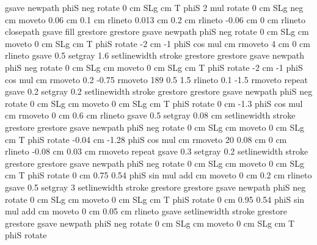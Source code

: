 {{gsave
     newpath
     phiS neg rotate
       0 cm SLg cm T
        phiS 2 mul rotate
         0 cm SLg  neg cm moveto
         0.06 cm 0.1 cm rlineto
         0.013 cm 0.2 cm rlineto
        -0.06 cm 0 cm rlineto
       closepath
     gsave
       \pst@usecolor\PoCMineCol fill
    grestore
grestore
gsave
     newpath
        phiS neg rotate
        0 cm SLg cm moveto
        0 cm SLg cm T
        phiS rotate
        -2 cm -1 phiS cos mul cm rmoveto
        4 cm 0 cm rlineto
    gsave
         0.5 setgray
                1.6 setlinewidth
         stroke
    grestore
grestore
gsave
     newpath
        phiS neg rotate
        0 cm SLg cm moveto
        0 cm SLg cm T
        phiS rotate
        -2 cm -1 phiS cos mul cm rmoveto
        0.2 -0.75 rmoveto
       189 { 0.5 1.5 rlineto
        0.1 -1.5 rmoveto } repeat
    gsave
         0.2 setgray
                0.2 setlinewidth
         stroke
    grestore
grestore
gsave
     newpath
        phiS neg rotate
        0 cm SLg cm moveto
        0 cm SLg cm T
        phiS rotate
        0 cm -1.3 phiS cos mul cm rmoveto
        0 cm 0.6 cm rlineto
    gsave
         0.5 setgray
                0.08 cm setlinewidth
         stroke
    grestore
grestore
gsave
     newpath
        phiS neg rotate
        0 cm SLg cm moveto
        0 cm SLg cm T
        phiS rotate
        -0.04 cm -1.28 phiS cos mul cm rmoveto
        20 { 0.08 cm 0 cm rlineto
        -0.08 cm 0.03 cm rmoveto } repeat
    gsave
         0.3 setgray
                0.2 setlinewidth
         stroke
    grestore
grestore
gsave
     newpath
        phiS neg rotate
        0 cm SLg cm moveto
        0 cm SLg cm T
        phiS rotate
        0 cm 0.75 0.54 phiS sin mul add cm moveto
        0 cm 0.2 cm rlineto
    gsave
         0.5 setgray
                3 setlinewidth
         stroke
    grestore
grestore
gsave
     newpath
        phiS neg rotate
        0 cm SLg cm moveto
        0 cm SLg cm T
        phiS rotate
        0 cm 0.95 0.54 phiS sin mul add cm moveto
        0 cm 0.05 cm rlineto
    gsave
         \pst@usecolor{} setlinewidth
         stroke
    grestore
grestore
gsave
     newpath
        phiS neg rotate
        0 cm SLg cm moveto
        0 cm SLg cm T
        phiS rotate
}}
